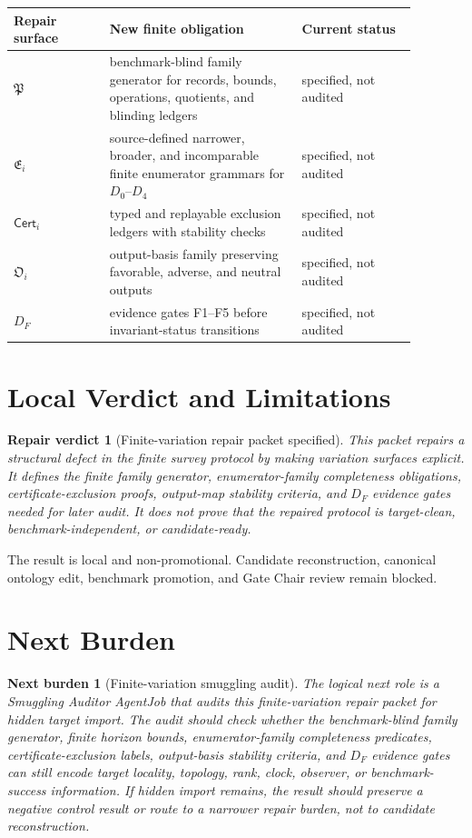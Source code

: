 \documentclass[11pt]{article}
\newcommand{\PackFam}{\mathfrak{P}}
\newcommand{\EnumFam}{\mathfrak{E}}
\newcommand{\Cert}{\mathsf{Cert}}
\newcommand{\OutFam}{\mathfrak{O}}
\newtheorem{repairverdict}{Repair verdict}
\newtheorem{nextburden}{Next burden}
\begin{document}
\begin{center}
\begin{tabular}{p{0.21\linewidth}p{0.42\linewidth}p{0.25\linewidth}}
\textbf{Repair surface} & \textbf{New finite obligation} & \textbf{Current status} \\
\hline
\(\PackFam\) & benchmark-blind family generator for records, bounds, operations, quotients, and blinding ledgers & specified, not audited \\
\(\EnumFam_i\) & source-defined narrower, broader, and incomparable finite enumerator grammars for \(D_0\)--\(D_4\) & specified, not audited \\
\(\Cert_i\) & typed and replayable exclusion ledgers with stability checks & specified, not audited \\
\(\OutFam_i\) & output-basis family preserving favorable, adverse, and neutral outputs & specified, not audited \\
\(D_F\) & evidence gates F1--F5 before invariant-status transitions & specified, not audited \\
\end{tabular}
\end{center}

\section{Local Verdict and Limitations}

\begin{repairverdict}[Finite-variation repair packet specified]
This packet repairs a structural defect in the finite survey protocol by
making variation surfaces explicit. It defines the finite family generator,
enumerator-family completeness obligations, certificate-exclusion proofs,
output-map stability criteria, and \(D_F\) evidence gates needed for later
audit. It does not prove that the repaired protocol is target-clean,
benchmark-independent, or candidate-ready.
\end{repairverdict}

The result is local and non-promotional. Candidate reconstruction, canonical
ontology edit, benchmark promotion, and Gate Chair review remain blocked.

\section{Next Burden}

\begin{nextburden}[Finite-variation smuggling audit]
The logical next role is a Smuggling Auditor AgentJob that audits this
finite-variation repair packet for hidden target import. The audit should
check whether the benchmark-blind family generator, finite horizon bounds,
enumerator-family completeness predicates, certificate-exclusion labels,
output-basis stability criteria, and \(D_F\) evidence gates can still encode
target locality, topology, rank, clock, observer, or benchmark-success
information. If hidden import remains, the result should preserve a negative
control result or route to a narrower repair burden, not to candidate
reconstruction.
\end{nextburden}
\end{document}
